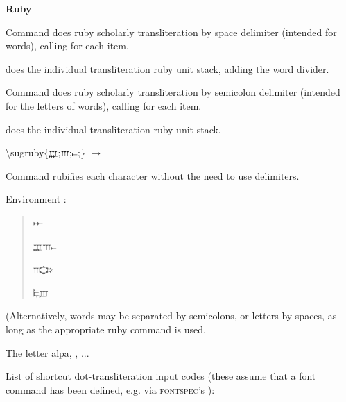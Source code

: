 \documentclass{article}
\begin{document}
\bigskip\textbf{Ruby}

Command \cs{\sugrubyw} does ruby scholarly transliteration by space delimiter (intended for words), calling \cs{\smaprubyw} for each item.

\cs{\smaprubyw} does the individual transliteration ruby unit stack, adding the word divider.



\bigskip
Command \cs{\sugruby} does ruby scholarly transliteration by semicolon delimiter (intended for the letters of words), calling \cs{\smapruby} for each item.

\cs{\smapruby} does the individual transliteration ruby unit stack.

{\ttfamily\color{blue}\textbackslash sugruby\{{\ugfont\scriptsize 𐎄};{\ugfont\scriptsize 𐎍};{\ugfont\scriptsize 𐎚};\}}
\enspace$\mapsto$\enspace
{}



\bigskip
Command \cs{\sugrubynd} rubifies each character without the need to use delimiters.

\bigskip
{}

Environment :

\begin{quotation}
\begin{sugrubynde}
𐎀

𐎄𐎍𐎚

𐎕𐎘𐎙

𐎛𐎜
\end{sugrubynde}
\end{quotation}

\bigskip
(Alternatively, words may be separated by semicolons, or letters by spaces, as long as the appropriate ruby command is used.

\bigskip
The letter alpa, , ...

\bigskip
List of shortcut dot-transliteration input codes (these assume that a font command \cs{\ugfont} has been defined, e.g. via \textsc{fontspec}'s ):
\end{document}
